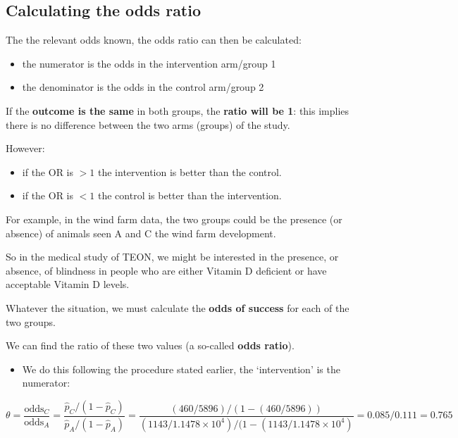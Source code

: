\documentclass[
  oneside]{krantz}
\providecommand{\tightlist}{%
  \setlength{\itemsep}{0pt}\setlength{\parskip}{0pt}}
\begin{document}
\hypertarget{calculating-the-odds-ratio}{%
\subsection{Calculating the odds ratio}\label{calculating-the-odds-ratio}}

The the relevant odds known, the odds ratio can then be calculated:

\begin{itemize}
\item
  the numerator is the odds in the intervention arm/group 1
\item
  the denominator is the odds in the control arm/group 2
\end{itemize}

If the \textbf{outcome is the same} in both groups, the \textbf{ratio will be 1}: this implies there is no difference between the two arms (groups) of the study.

However:

\begin{itemize}
\item
  if the OR is \(> 1\) the intervention is better than the control.
\item
  if the OR is \(< 1\) the control is better than the intervention.
\end{itemize}

For example, in the wind farm data, the two groups could be the presence (or absence) of animals seen A and C the wind farm development.

So in the medical study of TEON, we might be interested in the presence, or absence, of blindness in people who are either Vitamin D deficient or have acceptable Vitamin D levels.

Whatever the situation, we must calculate the \textbf{odds of success} for each of the two groups.

We can find the ratio of these two values (a so-called \textbf{odds ratio}).

\begin{itemize}
\tightlist
\item
  We do this following the procedure stated earlier, the `intervention' is the numerator:
\end{itemize}

\[\theta=\frac{\text{odds}_C}{\text{odds}_A}=\frac{\hat{p}_C/(1-\hat{p}_C)}{\hat{p}_A/(1-\hat{p}_A)}=\frac{(460 / 5896) / (1-(460/ 5896))}{(1143 / \ensuremath{1.1478\times 10^{4}}) / (1-(1143 / \ensuremath{1.1478\times 10^{4}})}= 0.085/ 0.111= 0.765\]
\end{document}
